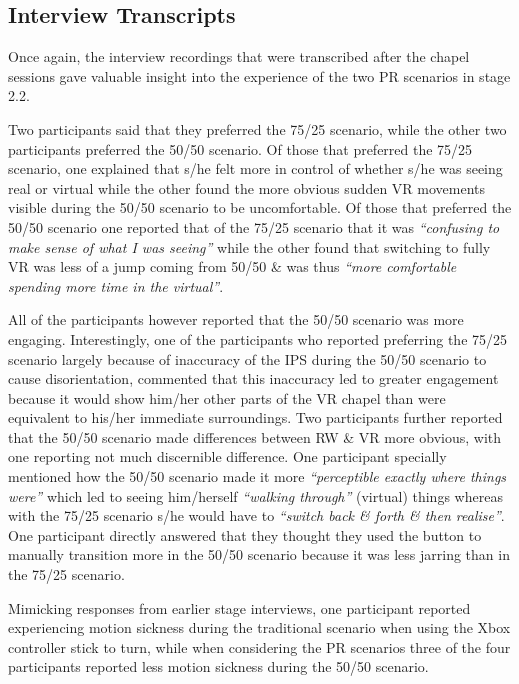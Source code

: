 
\subsection{Interview Transcripts}

Once again, the interview recordings that were transcribed after the chapel sessions gave valuable insight into the experience of the two PR scenarios in stage 2.2.

Two participants said that they preferred the 75/25 scenario, while the other two participants preferred the 50/50 scenario. Of those that preferred the 75/25 scenario, one explained that s/he felt more in control of whether s/he was seeing real or virtual while the other found the more obvious sudden VR movements visible during the 50/50 scenario to be uncomfortable. Of those that preferred the 50/50 scenario one reported that of the 75/25 scenario that it was \textit{``confusing to make sense of what I was seeing''} while the other found that switching to fully VR was less of a jump coming from 50/50 \& was thus \textit{``more comfortable spending more time in the virtual''}.

All of the participants however reported that the 50/50 scenario was more engaging. Interestingly, one of the participants who reported preferring the 75/25 scenario largely because of inaccuracy of the IPS during the 50/50 scenario to cause disorientation, commented that this inaccuracy led to greater engagement because it would show him/her other parts of the VR chapel than were equivalent to his/her immediate surroundings. Two participants further reported that the 50/50 scenario made differences between RW \& VR more obvious, with one reporting not much discernible difference. One participant specially mentioned how the 50/50 scenario made it more \textit{``perceptible exactly where things were''} which led to seeing him/herself \textit{``walking through''} (virtual) things whereas with the 75/25 scenario s/he would have to \textit{``switch back \& forth \& then realise''}. One participant directly answered that they thought they used the button to manually transition more in the 50/50 scenario because it was less jarring than in the 75/25 scenario.

Mimicking responses from earlier stage interviews, one participant reported experiencing motion sickness during the traditional scenario when using the Xbox controller stick to turn, while when considering the PR scenarios three of the four participants reported less motion sickness during the 50/50 scenario.


